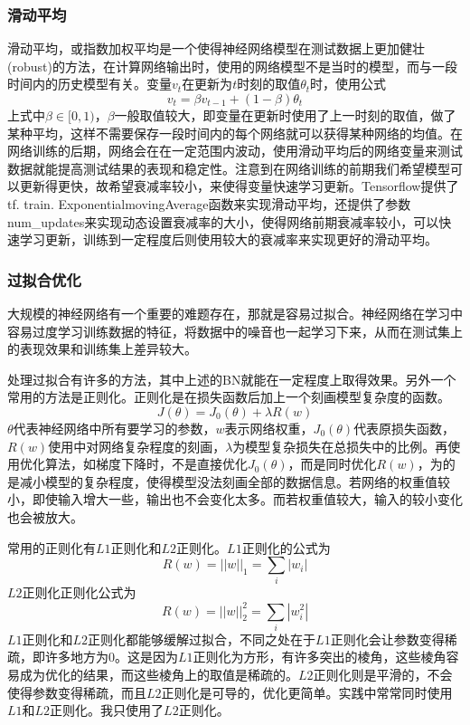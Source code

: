 \subsubsection{滑动平均}
\noindent

滑动平均，或指数加权平均是一个使得神经网络模型在测试数据上更加健壮(robust)的方法，在计算网络输出时，使用的网络模型不是当时的模型，而与一段时间内的历史模型有关。变量$v_t$在更新为$t$时刻的取值$\theta_t$时，使用公式
$$v_t = \beta v_{t-1} + (1 - \beta) \theta_t$$
上式中$\beta \in [0, 1)$，$\beta$一般取值较大，即变量在更新时使用了上一时刻的取值，做了某种平均，这样不需要保存一段时间内的每个网络就可以获得某种网络的均值。在网络训练的后期，网络会在在一定范围内波动，使用滑动平均后的网络变量来测试数据就能提高测试结果的表现和稳定性。注意到在网络训练的前期我们希望模型可以更新得更快，故希望衰减率较小，来使得变量快速学习更新。Tensorflow提供了tf. train. ExponentialmovingAverage函数来实现滑动平均，还提供了参数num\_updates来实现动态设置衰减率的大小，使得网络前期衰减率较小，可以快速学习更新，训练到一定程度后则使用较大的衰减率来实现更好的滑动平均。

\subsubsection{过拟合优化}
\noindent

大规模的神经网络有一个重要的难题存在，那就是容易过拟合。神经网络在学习中容易过度学习训练数据的特征，将数据中的噪音也一起学习下来，从而在测试集上的表现效果和训练集上差异较大。

处理过拟合有许多的方法，其中上述的BN就能在一定程度上取得效果。另外一个常用的方法是正则化。正则化是在损失函数后加上一个刻画模型复杂度的函数。
$$J(\theta) = J_0(\theta) + \lambda R(w)$$
$\theta$代表神经网络中所有要学习的参数，$w$表示网络权重，$J_0(\theta)$代表原损失函数，$R(w)$使用中对网络复杂程度的刻画，$\lambda$为模型复杂损失在总损失中的比例。再使用优化算法，如梯度下降时，不是直接优化$J_0(\theta)$，而是同时优化$R(w)$，为的是减小模型的复杂程度，使得模型没法刻画全部的数据信息。若网络的权重值较小，即使输入增大一些，输出也不会变化太多。而若权重值较大，输入的较小变化也会被放大。

常用的正则化有$L1$正则化和$L2$正则化。$L1$正则化的公式为
$$R(w) = ||w||_1 = \sum_i|w_i|$$
$L2$正则化正则化公式为
$$R(w) = ||w||_2^2 = \sum_i|w_i^2|$$
$L1$正则化和$L2$正则化都能够缓解过拟合，不同之处在于$L1$正则化会让参数变得稀疏，即许多地方为0。这是因为$L1$正则化为方形，有许多突出的棱角，这些棱角容易成为优化的结果，而这些棱角上的取值是稀疏的。$L2$正则化则是平滑的，不会使得参数变得稀疏，而且$L2$正则化是可导的，优化更简单。实践中常常同时使用$L1$和$L2$正则化。我只使用了$L2$正则化。

